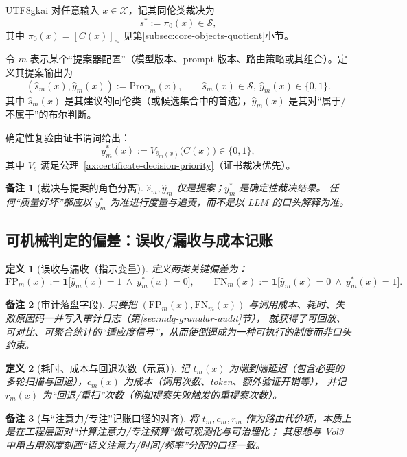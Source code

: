 \documentclass[12pt]{article}
\newtheorem{definition}{定义}[section]
\newtheorem{remark}{备注}[section]
\begin{document}
\begin{CJK*}{UTF8}{gkai}
对任意输入 $x\in\mathcal{X}$，记其同伦类裁决为
\[
s^\ast:=\pi_0(x)\in\mathcal{S},
\]
其中 $\pi_0(x)=[C(x)]_{\sim}$ 见第\ref{subsec:core-objects-quotient}小节。

令 $m$ 表示某个“提案器配置”（模型版本、prompt 版本、路由策略或其组合）。定义其提案输出为
\[
(\hat{s}_m(x),\hat{y}_m(x)):=\mathrm{Prop}_m(x),
\qquad
\hat{s}_m(x)\in\mathcal{S},\ \hat{y}_m(x)\in\{0,1\}.
\]
其中 $\hat{s}_m(x)$ 是其建议的同伦类（或候选集合中的首选），$\hat{y}_m(x)$ 是其对“属于/不属于”的布尔判断。

确定性复验由证书谓词给出：
\[
y^\ast_m(x):=V_{\hat{s}_m(x)}\bigl(C(x)\bigr)\in\{0,1\},
\]
其中 $V_s$ 满足公理~\ref{ax:certificate-decision-priority}（证书裁决优先）。

\begin{remark}[裁决与提案的角色分离]
$\hat{s}_m,\hat{y}_m$ 仅是提案；$y^\ast_m$ 是确定性裁决结果。
任何“质量好坏”都应以 $y^\ast_m$ 为准进行度量与追责，而不是以 LLM 的口头解释为准。
\end{remark}

\subsection{可机械判定的偏差：误收/漏收与成本记账}
\label{subsec:fp-fn-cost}

\begin{definition}[误收与漏收（指示变量）]
定义两类关键偏差为：
\[
\mathrm{FP}_m(x):=\mathbf{1}\bigl[\hat{y}_m(x)=1\ \wedge\ y^\ast_m(x)=0\bigr],
\qquad
\mathrm{FN}_m(x):=\mathbf{1}\bigl[\hat{y}_m(x)=0\ \wedge\ y^\ast_m(x)=1\bigr].
\]
\end{definition}

\begin{remark}[审计落盘字段]
只要把 $(\mathrm{FP}_m(x),\mathrm{FN}_m(x))$ 与调用成本、耗时、失败原因码一并写入审计日志（第\ref{sec:mdq-granular-audit}节），
就获得了可回放、可对比、可聚合统计的“适应度信号”，从而使倒逼成为一种可执行的制度而非口头约束。
\end{remark}

\begin{definition}[耗时、成本与回退次数（示意）]
记 $t_m(x)$ 为端到端延迟（包含必要的多轮扫描与回退），$c_m(x)$ 为成本（调用次数、token、额外验证开销等），
并记 $r_m(x)$ 为“回退/重扫”次数（例如提案失败触发的重提案次数）。
\end{definition}

\begin{remark}[与“注意力/专注”记账口径的对齐]
将 $t_m,c_m,r_m$ 作为路由代价项，本质上是在工程层面对“计算注意力/专注预算”做可观测化与可治理化；
其思想与 Vol3 中用占用测度刻画“语义注意力/时间/频率”分配的口径一致\cite{GaoZhengAppVol3}。
\end{remark}


\end{CJK*}
\end{document}
